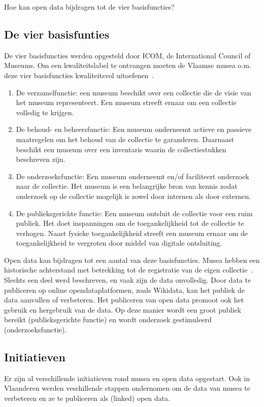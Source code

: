 \documentclass[fleqn,10pt]{voorstel}
\begin{document}
Hoe kan open data bijdragen tot de vier basisfuncties?

\subsection{De vier basisfunties}
De vier basisfuncties werden opgesteld door ICOM, de International Council of Museums. Om een kwaliteitslabel te ontvangen moeten de Vlaamse musea o.m. deze vier basisfuncties kwaliteitsvol uitoefenen~\autocite{CJSM2014}.
\begin{enumerate}
	\item De verzamelfunctie: een museum beschikt over een collectie die de visie van het museum representeert. Een museum streeft ernaar om een collectie volledig te krijgen.
	\item De behoud- en beheersfunctie: Een museum onderneemt actieve en passieve maatregelen om het behoud van de collectie te garanderen. Daarnaast beschikt een museum over een inventaris waarin de collectiestukken beschreven zijn.
	\item De onderzoeksfunctie: Een museum onderneemt en/of faciliteert onderzoek naar de collectie. Het museum is een belangrijke bron van kennis zodat onderzoek op de collectie mogelijk is zowel door internen als door externen.
	\item De publieksgerichte functie: Een museum ontsluit de collectie voor een ruim publiek. Het doet inspanningen om de toegankelijkheid tot de collectie te verhogen. Naast fysieke toegankelijkheid streeft een museum ernaar om de toegankelijkheid te vergroten door middel van digitale ontsluiting.
\end{enumerate}
Open data kan bijdragen tot een aantal van deze basisfuncties. Musea hebben een historische achterstand met betrekking tot de registratie van de eigen collectie~\autocite{Gatz2016}. Slechts een deel werd beschreven, en vaak zijn de data onvolledig. Door data te publiceren op online opendataplatformen, zoals Wikidata, kan het publiek de data aanvullen of verbeteren. Het publiceren van open data promoot ook het gebruik en hergebruik van de data. Op deze manier wordt een groot publiek bereikt (publieksgerichte functie) en wordt onderzoek gestimuleerd (onderzoeksfunctie).


\subsection{Initiatieven}
Er zijn al verschillende initiatieven rond musea en open data opgestart. Ook in Vlaanderen werden veschillende stappen ondernomen om de data van musea te verbeteren en ze te publiceren als (linked) open data.
\end{document}
